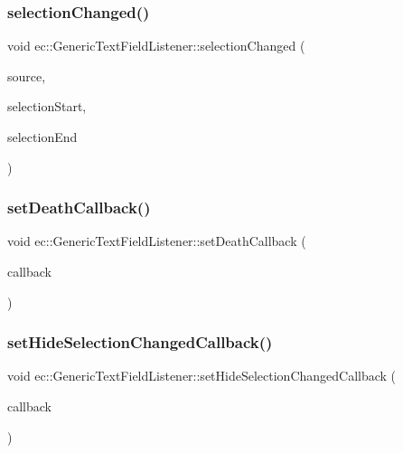 \subsubsection{\texorpdfstring{selection\+Changed()}{selectionChanged()}}
{\footnotesize\ttfamily void ec\+::\+Generic\+Text\+Field\+Listener\+::selection\+Changed (\begin{DoxyParamCaption}\item[{agui\+::\+Text\+Field $\ast$}]{source,  }\item[{int}]{selection\+Start,  }\item[{int}]{selection\+End }\end{DoxyParamCaption})\hspace{0.3cm}{\ttfamily [override]}}

\mbox{\label{classec_1_1_generic_text_field_listener_aaf8af37a52886c8551d0035fb99a54de}} 
\subsubsection{\texorpdfstring{set\+Death\+Callback()}{setDeathCallback()}}
{\footnotesize\ttfamily void ec\+::\+Generic\+Text\+Field\+Listener\+::set\+Death\+Callback (\begin{DoxyParamCaption}\item[{const \mbox{\hyperlink{classec_1_1_generic_text_field_listener_a720d56c97f2ac11e2658db516b186d4f}{Death\+\_\+\+Callback}} \&}]{callback }\end{DoxyParamCaption})}

\mbox{\label{classec_1_1_generic_text_field_listener_aedc528aad9dae07e00d2e19bfe68d655}} 
\subsubsection{\texorpdfstring{set\+Hide\+Selection\+Changed\+Callback()}{setHideSelectionChangedCallback()}}
{\footnotesize\ttfamily void ec\+::\+Generic\+Text\+Field\+Listener\+::set\+Hide\+Selection\+Changed\+Callback (\begin{DoxyParamCaption}\item[{const \mbox{\hyperlink{classec_1_1_generic_text_field_listener_a1a1f11d8e8c473760260f7ed5cacb458}{Hide\+Selection\+Changed\+\_\+\+Callback}} \&}]{callback }\end{DoxyParamCaption})}


